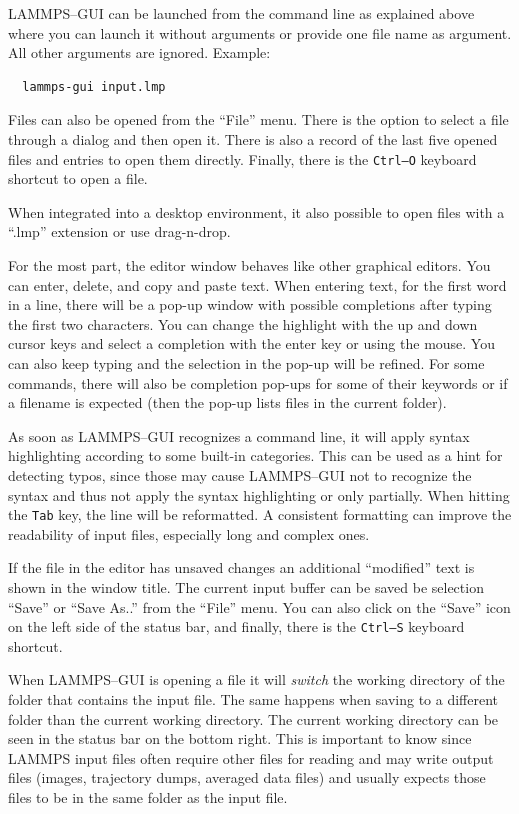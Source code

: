 \documentclass[9pt,tutorial]{livecoms}
\begin{document}
\begin{appendices}
LAMMPS--GUI can be launched from the command line as explained above where you
can launch it without arguments or provide one file name as argument.  All
other arguments are ignored. Example:
{
\normalsize
\begin{verbatim}
  lammps-gui input.lmp
\end{verbatim}
}
Files can also be opened from the ``File'' menu.  There is the option
to select a file through a dialog and then open it.  There is also a
record of the last five opened files and entries to open them directly.
Finally, there is the \texttt{Ctrl--O} keyboard shortcut to open a file.

When integrated into a desktop environment, it also possible to open
files with a ``.lmp'' extension or use drag-n-drop.

For the most part, the editor window behaves like other graphical
editors.  You can enter, delete, and copy and paste text.  When entering
text, for the first word in a line, there will be a pop-up window with
possible completions after typing the first two characters. You can
change the highlight with the up and down cursor keys and select a
completion with the enter key or using the mouse.  You can also keep
typing and the selection in the pop-up will be refined.  For some
commands, there will also be completion pop-ups for some of their
keywords or if a filename is expected (then the pop-up lists files in
the current folder).

As soon as LAMMPS--GUI recognizes a command line, it will apply syntax
highlighting according to some built-in categories.  This can be used as
a hint for detecting typos, since those may cause LAMMPS--GUI not to
recognize the syntax and thus not apply the syntax highlighting or only
partially.  When hitting the \texttt{Tab} key, the line will be
reformatted.  A consistent formatting can improve the readability of
input files, especially long and complex ones.

If the file in the editor has unsaved changes an additional
``\*modified\*'' text is shown in the window title.  The current input
buffer can be saved be selection ``Save'' or ``Save As..'' from the
``File'' menu.  You can also click on the ``Save'' icon on the left side
of the status bar, and finally, there is the \texttt{Ctrl--S} keyboard
shortcut.


\begin{note}
When LAMMPS--GUI is opening a file it will \emph{switch} the working directory
of the folder that contains the input file.  The same happens when saving to
a different folder than the current working directory.  The current working
directory can be seen in the status bar on the bottom right.  This is important
to know since LAMMPS input files often require other files for reading and may
write output files (images, trajectory dumps, averaged data files) and usually
expects those files to be in the same folder as the input file.
\end{note}


\end{appendices}
\end{document}
